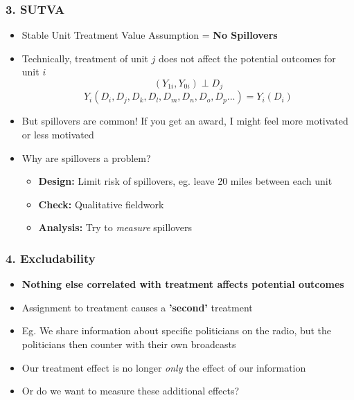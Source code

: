 \documentclass[xcolor=x11names,compress]{beamer}\usepackage[]{graphicx}\usepackage[]{color}
\renewcommand{\(}{\begin{columns}}
\renewcommand{\)}{\end{columns}}
\newcommand{\<}[1]{\begin{column}{#1}}
\renewcommand{\>}{\end{column}}
\begin{document}
\begin{frame}
\frametitle{3. SUTVA}
\begin{itemize}
\item Stable Unit Treatment Value Assumption = \textbf{No Spillovers}
\pause
\item Technically, treatment of unit $j$ does not affect the potential outcomes for unit $i$
\pause
$$(Y_{1i}, Y_{0i}) \perp D_j$$
\pause
$$Y_i(D_i, D_j, D_k, D_l, D_m, D_n, D_o, D_p...) = Y_i(D_i)$$
\pause
\item But spillovers are common! If you get an award, I might feel more motivated or less motivated
\pause
\item Why are spillovers a problem?
\pause
\begin{itemize}
\item \textbf{Design:} Limit risk of spillovers, eg. leave 20 miles between each unit
\item \textbf{Check:} Qualitative fieldwork
\item \textbf{Analysis:} Try to \textit{measure} spillovers
\end{itemize}
\end{itemize}
\end{frame}

\begin{frame}
\frametitle{4. Excludability}
\begin{itemize}
\item \textbf{Nothing else correlated with treatment affects potential outcomes}
\pause
\item Assignment to treatment causes a \textbf{'second'} treatment
\pause
\item Eg. We share information about specific politicians on the radio, but the politicians then counter with their own broadcasts
\pause
\item Our treatment effect is no longer \textit{only} the effect of our information
\pause
\item Or do we want to measure these additional effects?
\end{itemize}
\end{frame}
\end{document}
